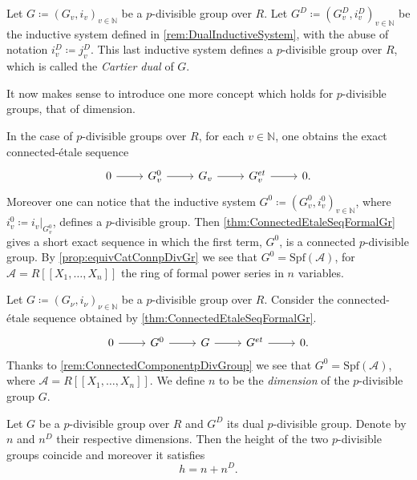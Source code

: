 \documentclass[../Main]{subfiles}
\begin{document}
\begin{defn}
	Let $G \coloneqq \left( G_v, i_v \right)_{v \in \mathbb{N}}$ be a $p$-divisible group over $R$.
	Let $G^D \coloneqq \left( G_v^D, i_v^D \right)_{v \in \mathbb{N}}$ be the inductive system
	defined in \cref{rem:DualInductiveSystem}, with the abuse of notation
	$i_v^D \coloneqq j_v^D$.
	This last inductive system defines a $p$-divisible group over $R$,
	which is called the {\em Cartier dual} of $G$.
\end{defn}


\noindent
It now makes sense to introduce one more concept which holds for $p$-divisible
groups, that of dimension.
\begin{rem}[]\label{rem:ConnectedComponentpDivGroup}
	In the case of $p$-divisible groups over $R$, for each $v \in \mathbb{N}$, one obtains
	the exact connected-étale sequence
	\begin{equation*}
	\begin{tikzcd}
		0 \arrow[r, "", rightarrow] &
		G^0_v \arrow[r, "", rightarrow] &
		G_v \arrow[r, "", rightarrow] &
		G^{et}_v \arrow[r, "", rightarrow] &
		0
	.\end{tikzcd}
	\end{equation*}
	Moreover one can notice that the inductive system 
	$G^0 \coloneqq \left( G^0_v, i^0_v \right)_{v \in \mathbb{N}}$,
	where $i^0_v \coloneqq \left.i_v\right|_{G^0_v}$, defines a $p$-divisible group.
	Then \cref{thm:ConnectedEtaleSeqFormalGr} gives a short exact sequence
	in which the first term, $G^0$, is a connected $p$-divisible group.
	By \cref{prop:equivCatConnpDivGr} we see that $G^0 = \mathrm{Spf}(\mathscr{A})$,
	for $\mathscr{A} = R [\![ X_1, \ldots, X_{ n } ]\!]$ the ring of 
	formal power series in $n$ variables.
\end{rem}


\begin{defn}
	Let $G \coloneqq \left(G_{\nu}, i_\nu\right)_{\nu \in \mathbb{N}}$ be a $p$-divisible group
	over $R$.
	Consider the connected-étale sequence obtained by 
	\cref{thm:ConnectedEtaleSeqFormalGr}.
	\begin{equation*}
	\begin{tikzcd}
		0 \arrow[r, "", rightarrow] &
		G^0 \arrow[r, "", rightarrow] &
		G \arrow[r, "", rightarrow] &
		G^{et} \arrow[r, "", rightarrow] &
		0
	.\end{tikzcd}
	\end{equation*}
	Thanks to \cref{rem:ConnectedComponentpDivGroup} we see that
	$G^0 = \mathrm{Spf}(\mathscr{A})$, where
	$\mathscr{A} = R [\![ X_1, \ldots, X_{ n } ]\!]$.
	We define $n$ to be the {\em dimension} of the $p$-divisible group $G$.
\end{defn}


\begin{prop}
	Let $G$ be a $p$-divisible group over $R$
	and $G^D$ its dual $p$-divisible group.
	Denote by $n$ and $n^D$ their respective dimensions.
	Then the height of the two $p$-divisible groups
	coincide and moreover it satisfies
	\begin{equation*}
	h = n + n^D
	.\end{equation*}
\end{prop}
\end{document}
